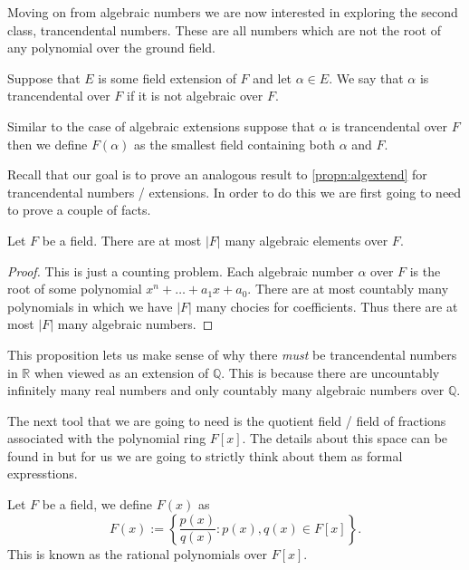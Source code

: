 Moving on from algebraic numbers we are now interested in exploring the second
class, trancendental numbers.  These are all numbers which are not the root of 
any polynomial over the ground field. 

\begin{defn}
  Suppose that $E$ is some field extension of $F$ and let $\alpha \in E$. We
  say that $\alpha$ is trancendental over $F$ if it is not algebraic over $F$.
\end{defn}

\begin{defn}
  Similar to the case of algebraic extensions suppose that $\alpha$ is
  trancendental over $F$ then we define $F(\alpha)$ as the smallest field
  containing both $\alpha$ and $F$.
\end{defn}

Recall that our goal is to prove an analogous result to \cref{propn:algextend}
for trancendental numbers / extensions. In order to do this we are first going
to need to prove a couple of facts. 

\begin{propn}\label{propn:existtrans}
  Let $F$ be a field. There are at most $|F|$ many algebraic elements over $F$.
\end{propn}
\begin{proof}
  This is just a counting problem. Each algebraic number $\alpha$ over $F$ is
  the root of some polynomial $x^{n} + \ldots + a_1x + a_0$. There are at most
  countably many polynomials in which we have $|F|$ many chocies for
  coefficients. Thus there are at most $|F|$ many algebraic numbers.
\end{proof}

This proposition lets us make sense of why there \textit{must} be trancendental
numbers in $\mathbb{R}$ when viewed as an extension of $\mathbb{Q}$. This is
because there are uncountably infinitely many real numbers and only countably
many algebraic numbers over $\mathbb{Q}$. 

The next tool that we are going to need is the quotient field / field of
fractions associated with the polynomial ring $F[x]$. The details about this
space can be found in \cite{Dummit_Foote_2004} but for us we are going to
strictly think about them as formal expresstions.

\begin{defn}
  Let $F$ be a field, we define $F(x)$ as
  \[
    F(x) := \left\{\frac{p(x)}{q(x)}: p(x), q(x) \in F[x]\right\} 
  .\] 
  This is known as the rational polynomials over $F[x]$.
\end{defn}

